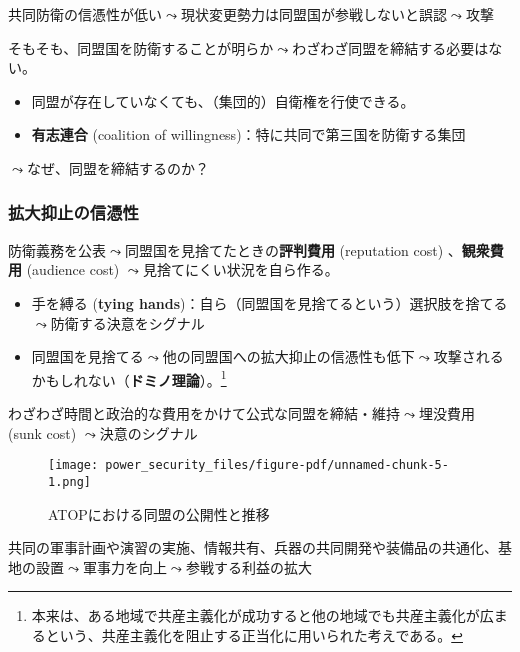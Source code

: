 \documentclass[
  xelatex,
  ja=standard]{bxjsarticle}
\providecommand{\tightlist}{%
  \setlength{\itemsep}{0pt}\setlength{\parskip}{0pt}}\usepackage{longtable,booktabs,array}
\begin{document}
共同防衛の信憑性が低い\(\leadsto\)現状変更勢力は同盟国が参戦しないと誤認\(\leadsto\)攻撃

そもそも、同盟国を防衛することが明らか\(\leadsto\)わざわざ同盟を締結する必要はない。

\begin{itemize}
\tightlist
\item
  同盟が存在していなくても、（集団的）自衛権を行使できる。
\item
  \textbf{有志連合} (coalition of
  willingness)：特に共同で第三国を防衛する集団
\end{itemize}

\(\leadsto\)なぜ、同盟を締結するのか？

\hypertarget{ux62e1ux5927ux6291ux6b62ux306eux4fe1ux6191ux6027}{%
\subsubsection{拡大抑止の信憑性}\label{ux62e1ux5927ux6291ux6b62ux306eux4fe1ux6191ux6027}}

防衛義務を公表\(\leadsto\)同盟国を見捨てたときの\textbf{評判費用}
(reputation cost) 、\textbf{観衆費用} (audience cost)
\(\leadsto\)見捨てにくい状況を自ら作る\citep{fearon1997}。

\begin{itemize}
\tightlist
\item
  手を縛る (\textbf{tying
  hands})：自ら（同盟国を見捨てるという）選択肢を捨てる\(\leadsto\)防衛する決意をシグナル
\item
  同盟国を見捨てる\(\leadsto\)他の同盟国への拡大抑止の信憑性も低下\(\leadsto\)攻撃されるかもしれない（\textbf{ドミノ理論}）。\footnote{本来は、ある地域で共産主義化が成功すると他の地域でも共産主義化が広まるという、共産主義化を阻止する正当化に用いられた考えである。}
\end{itemize}

わざわざ時間と政治的な費用をかけて公式な同盟を締結・維持\(\leadsto\)埋没費用
(sunk cost) \(\leadsto\)決意のシグナル

\begin{figure}[htpb]

{\centering \texttt{[image: power\_security\_files/figure-pdf/unnamed-chunk-5-1.png]}

}

\caption{ATOPにおける同盟の公開性と推移}

\end{figure}

共同の軍事計画や演習の実施、情報共有、兵器の共同開発や装備品の共通化、基地の設置\(\leadsto\)軍事力を向上\(\leadsto\)参戦する利益の拡大
\end{document}

